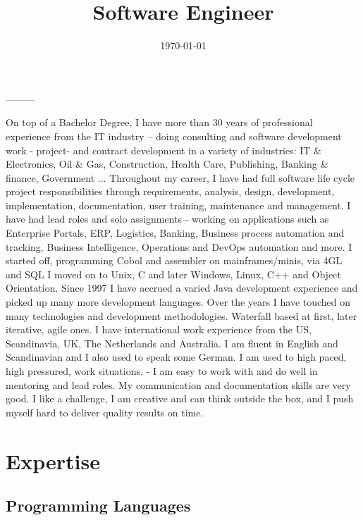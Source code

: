 \documentclass[11pt,a4paper,sans]{moderncv} %
\title{Software Engineer}
\begin{document}
\makecvtitle
\date{\today} %
\closing{---------}


On top of a Bachelor Degree, I have more than 30 years of professional
experience from the IT industry – doing consulting and software
development work - project- and contract development in a
variety of industries: IT \& Electronics, Oil \& Gas, Construction, Health
Care, Publishing, Banking \& finance, Government ...
\newline{}
\newline{}
Throughout my career, I have had full software life cycle project
responsibilities through requirements, analysis, design, development,
implementation, documentation, user training, maintenance and
management. I have had lead roles and solo assignments - working on
applications such as  Enterprise Portals, ERP, Logistics, Banking,
Business process automation and tracking, Business Intelligence, 
Operations and DevOps automation and more. 
\newline{}
\newline{}
I started off, programming Cobol and assembler on mainframes/minis, via
4GL and SQL I moved on to Unix, C and later Windows, Linux, C++ and Object
Orientation. Since 1997 I have accrued a varied Java development
experience and picked up many more development languages. 
Over the years I have touched on many technologies and development methodologies. 
Waterfall based at first, later iterative, agile ones.  
\newline{}
\newline{}
I have international work experience from the
US, Scandinavia, UK, The Netherlands and Australia. I am fluent in English and
Scandinavian and I also used to speak some German.
\newline{}
\newline{}
I am used to high paced, high pressured, work situations.  - I am easy
to work with and do well in mentoring and lead roles. My communication
and documentation skills are very good.  I like a challenge, I am
creative and can think outside the box, and I push myself hard to
deliver quality results on time.

\makeletterclosing
\pagebreak

\section{Expertise}
\subsection{Programming Languages}
\end{document}
